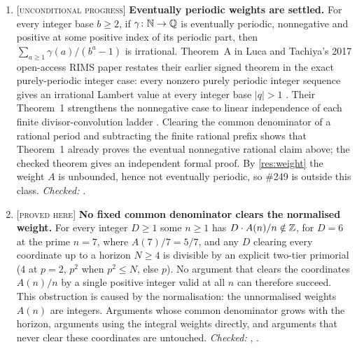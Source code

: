\documentclass[11pt]{article}
\newcommand{\Aw}{A}
\newcommand{\stag}[1]{{\normalfont\footnotesize\textsc{[#1]}}}
\begin{document}
{\begin{enumerate}[label=\textbf{R\arabic*.},ref=R\arabic*,leftmargin=2.4em,
  itemsep=0.2em,topsep=0.25em]
\item\label{res:periodic} \stag{unconditional progress}
\textbf{Eventually periodic weights are settled.}  For every integer base
$b\ge2$, if $\gamma\colon\mathbb{N}\to\mathbb{Q}$ is eventually periodic, nonnegative and
positive at some positive index of its periodic part, then
  $\sum_{a\ge1}\gamma(a)/(b^a-1)$ is irrational.  Theorem~A in Luca and
  Tachiya's 2017 open-access RIMS paper restates their earlier signed theorem in the exact
  purely-periodic integer case: every nonzero purely periodic integer sequence
  gives an irrational Lambert value at every integer base $|q|>1$
  \cite[Theorem~A, p.~139]{lucatachiya2017}.  Their Theorem~1 strengthens the
  nonnegative case to linear independence of each finite divisor-convolution
  ladder \cite[Theorem~1, p.~139; proof pp.~149--150]{lucatachiya2017}.
  Clearing the common denominator of a rational period and subtracting the
  finite rational prefix shows that Theorem~1 already proves the eventual
  nonnegative rational claim above; the checked theorem gives an independent
  formal proof.  By \ref{res:weight} the weight $\Aw$ is
unbounded, hence not eventually periodic, so \#249 is outside this class.
{\footnotesize\emph{Checked:}
.}

\item\label{res:primindex} \stag{proved here}
\textbf{No fixed common denominator clears the normalised weight.}  For every integer
$D\ge1$ some $n\ge1$ has $D\cdot\Aw(n)/n\notin\Z$, for $D=6$ at the prime
$n=7$, where $\Aw(7)/7=5/7$, and any $D$ clearing every coordinate up to a
horizon $N\ge4$ is divisible by an explicit two-tier primorial ($4$ at $p=2$,
$p^2$ when $p^2\le N$, else $p$).  No argument that clears the coordinates
$\Aw(n)/n$ by a single positive integer valid at all $n$ can therefore
succeed.  This obstruction is caused by the normalisation: the unnormalised
weights $\Aw(n)$ are integers.  Arguments whose common denominator grows with
the horizon, arguments using the integral weights directly, and arguments
that never clear these coordinates are untouched.
{\footnotesize\emph{Checked:}
,
.}


\end{enumerate}}
\end{document}
